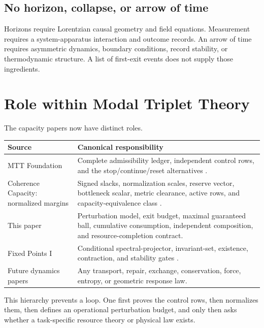 \documentclass[11pt]{article}
\theoremstyle{definition}
\theoremstyle{remark}
\begin{document}
\subsection{No horizon, collapse, or arrow of time}

Horizons require Lorentzian causal geometry and field equations.
Measurement requires a system-apparatus interaction and outcome records.
An arrow of time requires asymmetric dynamics, boundary conditions,
record stability, or thermodynamic structure.  A list of first-exit events
does not supply those ingredients.

\section{Role within Modal Triplet Theory}
\label{sec:mtt}

The capacity papers now have distinct roles.

\begin{center}
\begin{tabularx}{\textwidth}{@{}L{0.28\textwidth}Y@{}}
\toprule
Source & Canonical responsibility \\
\midrule
MTT Foundation
& Complete admissibility ledger, independent control rows, and the
  stop/continue/reset alternatives \cite{MTTFoundation2026}.\\

Coherence Capacity: normalized margins
& Signed slacks, normalization scales, reserve vector, bottleneck scalar,
  metric clearance, active rows, and capacity-equivalence class
  \cite{CapacityMargin2026}.\\

This paper
& Perturbation model, exit budget, maximal guaranteed ball, cumulative
  consumption, independent composition, and resource-completion contract.\\

Fixed Points I
& Conditional spectral-projector, invariant-set, existence, contraction,
  and stability gates \cite{FixedPointsI2026}.\\

Future dynamics papers
& Any transport, repair, exchange, conservation, force, entropy, or
  geometric response law.\\
\bottomrule
\end{tabularx}
\end{center}

This hierarchy prevents a loop.  One first proves the control rows, then
normalizes them, then defines an operational perturbation budget, and only
then asks whether a task-specific resource theory or physical law exists.
\end{document}
